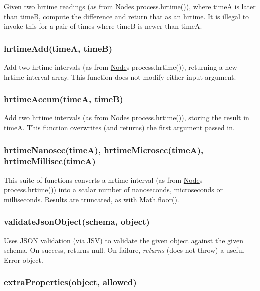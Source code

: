 Given two hrtime readings (as from \mbox{\hyperlink{classNode}{Node}}\textquotesingle{}s {\ttfamily process.\+hrtime()}), where timeA is later than timeB, compute the difference and return that as an hrtime. It is illegal to invoke this for a pair of times where timeB is newer than timeA.

\subsubsection*{hrtime\+Add(time\+A, time\+B)}

Add two hrtime intervals (as from \mbox{\hyperlink{classNode}{Node}}\textquotesingle{}s {\ttfamily process.\+hrtime()}), returning a new hrtime interval array. This function does not modify either input argument.

\subsubsection*{hrtime\+Accum(time\+A, time\+B)}

Add two hrtime intervals (as from \mbox{\hyperlink{classNode}{Node}}\textquotesingle{}s {\ttfamily process.\+hrtime()}), storing the result in {\ttfamily timeA}. This function overwrites (and returns) the first argument passed in.

\subsubsection*{hrtime\+Nanosec(time\+A), hrtime\+Microsec(time\+A), hrtime\+Millisec(time\+A)}

This suite of functions converts a hrtime interval (as from \mbox{\hyperlink{classNode}{Node}}\textquotesingle{}s {\ttfamily process.\+hrtime()}) into a scalar number of nanoseconds, microseconds or milliseconds. Results are truncated, as with {\ttfamily Math.\+floor()}.

\subsubsection*{validate\+Json\+Object(schema, object)}

Uses J\+S\+ON validation (via J\+SV) to validate the given object against the given schema. On success, returns null. On failure, {\itshape returns} (does not throw) a useful Error object.

\subsubsection*{extra\+Properties(object, allowed)}

